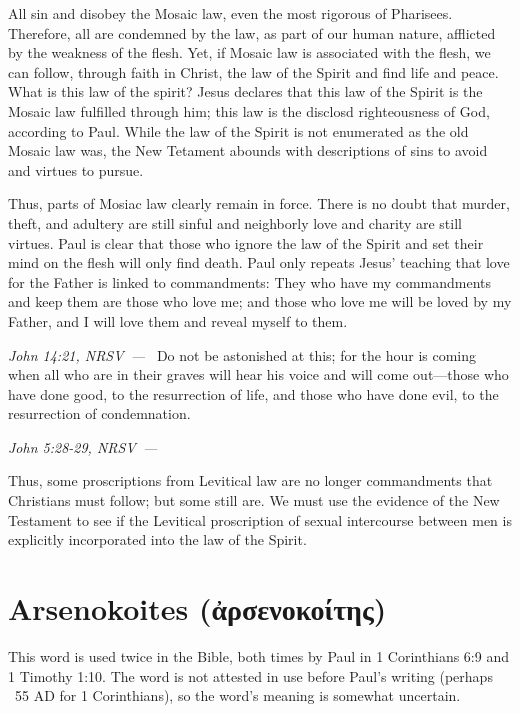 \documentclass[10pt]{article}
\let\oldquote\quote
\let\endoldquote\endquote
\renewenvironment{quote}[2][]
  {\if\relax\detokenize{#1}\relax
     \def\quoteauthor{#2}%
   \else
     \def\quoteauthor{#2~---~#1}%
   \fi
   \oldquote}
  {\par\nobreak\smallskip\hfill\textit{\quoteauthor}%
   \endoldquote\addvspace{\bigskipamount}}
\begin{document}
All sin and disobey the Mosaic law, even the most rigorous of Pharisees. Therefore, all are condemned by the law, as part of our human nature, afflicted by the weakness of the flesh. Yet, if Mosaic law is associated with the flesh,  we can follow, through faith in Christ, the law of the Spirit and find life and peace. What is this law of the spirit? Jesus declares that this law of the Spirit is the Mosaic law fulfilled through him; this law is the disclosd righteousness of God, according to Paul. While the law of the Spirit is not enumerated as the old Mosaic law was, the New Tetament abounds with descriptions of sins to avoid and virtues to pursue. 

Thus, parts of Mosiac law clearly remain in force. There is no doubt that murder, theft, and adultery are still sinful and neighborly love and charity are still virtues. Paul is clear that those who ignore the law of the Spirit and set their mind on the flesh will only find death. Paul only repeats Jesus' teaching that love for the Father is linked to commandments:
\begin{quote}{John 14:21, NRSV}
They who have my commandments and keep them are those who love me; and those who love me will be loved by my Father, and I will love them and reveal myself to them.
\end{quote}
\begin{quote}{John 5:28-29, NRSV}
Do not be astonished at this; for the hour is coming when all who are in their graves will hear his voice and will come out—those who have done good, to the resurrection of life, and those who have done evil, to the resurrection of condemnation.
\end{quote}

Thus, some proscriptions from Levitical law are no longer commandments that Christians must follow; but some still are. We must use the evidence of the New Testament to see if the Levitical proscription of sexual intercourse between men is explicitly incorporated into the law of the Spirit. 


\section*{Arsenokoites ({\textgreekfont ἀρσενοκοίτης)}}

This word is used twice in the Bible, both times by Paul in 1 Corinthians 6:9 and 1 Timothy 1:10. The word is not attested in use before Paul's writing (perhaps ~55 AD for 1 Corinthians), so the word's meaning is somewhat uncertain. 
\end{document}
